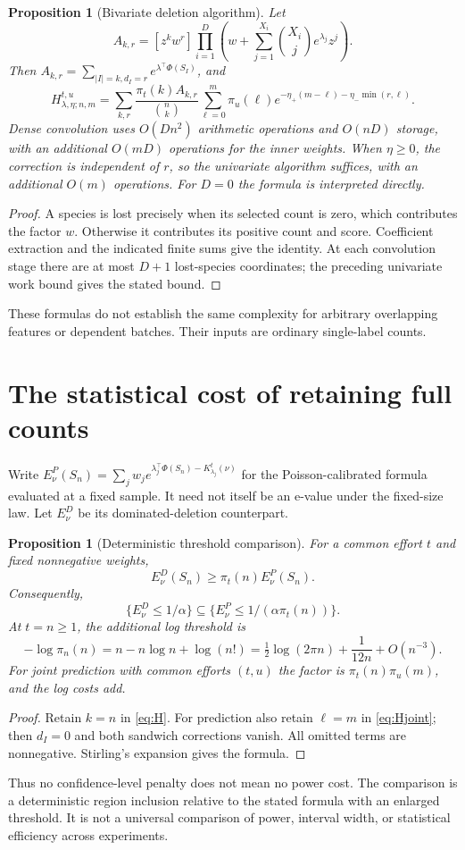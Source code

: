\documentclass[11pt]{article}
\newtheorem{proposition}[theorem]{Proposition}
\theoremstyle{remark}\newtheorem{remark}[theorem]{Remark}
\begin{document}
\begin{proposition}[Bivariate deletion algorithm]\label{prop:bivariate}
Let
\[
 A_{k,r}=[z^kw^r]\prod_{i=1}^D
 \left(w+\sum_{j=1}^{X_i}\binom{X_i}{j}e^{\lambda_j}z^j\right).
\]
Then $A_{k,r}=\sum_{|I|=k,d_I=r}e^{\lambda^\top\Phi(S_I)}$, and
\[
 H_{\lambda,\eta;n,m}^{t,u}
 =\sum_{k,r}\frac{\pi_t(k)A_{k,r}}{\binom nk}
       \sum_{\ell=0}^m\pi_u(\ell)
       e^{-\eta_+(m-\ell)-\eta_-\min(r,\ell)}.
\]
Dense convolution uses $O(Dn^2)$ arithmetic operations and $O(nD)$
storage, with an additional $O(mD)$ operations for the inner weights.
When $\eta\ge0$, the correction is independent of $r$, so the
univariate algorithm suffices, with an additional $O(m)$ operations.
For $D=0$ the formula is interpreted directly.
\end{proposition}
\begin{proof}
A species is lost precisely when its selected count is zero, which contributes
the factor $w$. Otherwise it contributes its positive count and score.
Coefficient extraction and the indicated finite sums give the identity.
At each convolution stage there are at most $D+1$ lost-species coordinates;
the preceding univariate work bound gives the stated bound.
\end{proof}
These formulas do not establish the same complexity for arbitrary overlapping
features or dependent batches. Their inputs are ordinary single-label counts.

\section{The statistical cost of retaining full counts}
Write $E^P_\nu(S_n)=\sum_jw_j
 e^{\lambda_j^\top\Phi(S_n)-K_{\lambda_j}^t(\nu)}$
for the Poisson-calibrated formula evaluated at a fixed sample.
It need not itself be an e-value under the fixed-size law.
Let $E^D_\nu$ be its dominated-deletion counterpart.

\begin{proposition}[Deterministic threshold comparison]\label{prop:cost}
For a common effort $t$ and fixed nonnegative weights,
\[
 E^D_\nu(S_n)\ge\pi_t(n)E^P_\nu(S_n).
\]
Consequently,
\[
 \{E^D_\nu\le1/\alpha\}
 \subseteq\{E^P_\nu\le1/(\alpha\pi_t(n))\}.
\]
At $t=n\ge1$, the additional log threshold is
\[
 -\log\pi_n(n)=n-n\log n+\log(n!)
 =\tfrac12\log(2\pi n)+\frac1{12n}+O(n^{-3}).
\]
For joint prediction with common efforts $(t,u)$ the factor is
$\pi_t(n)\pi_u(m)$, and the log costs add.
\end{proposition}
\begin{proof}
Retain $k=n$ in \eqref{eq:H}. For prediction also retain $\ell=m$
in \eqref{eq:Hjoint}; then $d_I=0$ and both sandwich corrections vanish.
All omitted terms are nonnegative. Stirling's expansion gives the formula.
\end{proof}
Thus no confidence-level penalty does not mean no power cost.
The comparison is a deterministic region inclusion relative to the stated
formula with an enlarged threshold. It is not a universal comparison of
power, interval width, or statistical efficiency across experiments.
\end{document}
